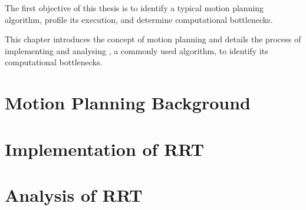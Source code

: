 
The first objective of this thesis is to identify a typical motion planning algorithm, profile its execution, and determine computational bottlenecks.

This chapter introduces the concept of motion planning and details the process of implementing and analysing , a commonly used algorithm, to identify its computational bottlenecks.\\

\section{Motion Planning Background} 
\label{section:motion_planning_background}
    

\newpage
\section{Implementation of RRT}
\label{section:rrt}
    

\newpage
\section{Analysis of RRT}
\label{section:rrt_analysis}
    
